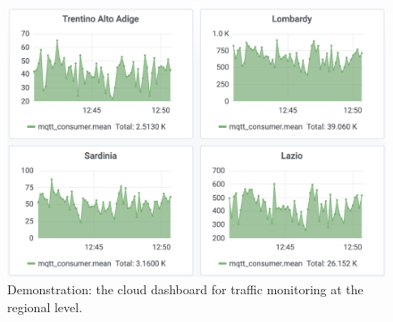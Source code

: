 \begin{figure}[htbp]
\centerline{
\includegraphics[width=1\linewidth]{figures/fog_dashboard_big.png}}
\caption{Demonstration: the cloud dashboard for traffic monitoring at the regional level.}
\label{fig:dashboard}
\end{figure}


